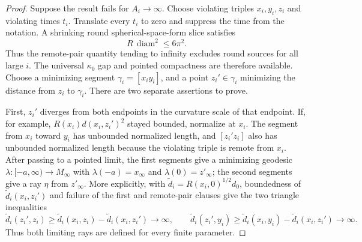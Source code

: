 \documentclass[10pt]{coll-l}
\theoremstyle{definition}
\theoremstyle{remark}
\numberwithin{section}{chapter}
\numberwithin{equation}{chapter}
\begin{document}
\begin{proof}
Suppose the result fails for $A_i\to\infty$.  Choose violating triples
$x_i,y_i,z_i$ and violating times $t_i$.  Translate every $t_i$ to zero
and suppress the time from the notation.  A shrinking round
spherical-space-form slice satisfies
\begin{equation}
                 R\,\operatorname{diam}^2\leq6\pi^2. \label{eq:ncs-round-remote-bound}
\end{equation}
Thus the remote-pair quantity tending to infinity excludes round sources
for all large $i$.  The universal $\kappa_0$ gap and pointed compactness
are therefore available.  Choose a minimizing segment
$\gamma_i=[x_iy_i]$, and a point
$z_i'\in\gamma_i$ minimizing the distance from $z_i$ to $\gamma_i$.
There are two separate assertions to prove.

First, $z_i'$ diverges from both endpoints in the curvature scale of that
endpoint.  If, for example,
$R(x_i)d(x_i,z_i')^2$ stayed bounded, normalize at $x_i$.  The segment from
$x_i$ toward $y_i$ has unbounded normalized length, and
$[z_i'z_i]$ also has unbounded normalized length because the violating
triple is remote from $x_i$.  After passing to a pointed limit, the first
segments give a minimizing geodesic
$\lambda:[-a,\infty)\to M_\infty$ with
$\lambda(-a)=x_\infty$ and $\lambda(0)=z'_\infty$; the second segments
give a ray $\eta$ from $z'_\infty$.  More explicitly, with
$\widetilde d_i=R(x_i,0)^{1/2}d_0$, boundedness of
$\widetilde d_i(x_i,z_i')$ and failure of the first and remote-pair
clauses give the two triangle inequalities
\begin{equation}
 \widetilde d_i(z_i',z_i)
   \geq\widetilde d_i(x_i,z_i)-\widetilde d_i(x_i,z_i')
       \longrightarrow\infty,
 \qquad
 \widetilde d_i(z_i',y_i)
   \geq\widetilde d_i(x_i,y_i)-\widetilde d_i(x_i,z_i')
       \longrightarrow\infty.                        \label{eq:ncs-two-rays-have-infinite-length}
\end{equation}
Thus both limiting rays are defined for every finite parameter.


\end{proof}
\end{document}
